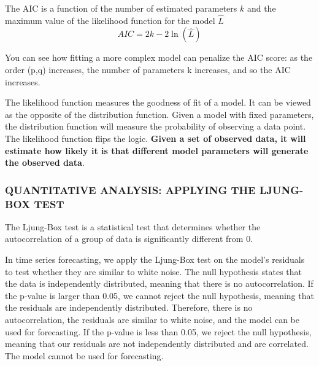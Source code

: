 The AIC is a function of the number of estimated parameters $k$ and the maximum value of the likelihood function for the model $\hat{L}$
\begin{equation}
    AIC = 2k-2\ln(\hat{L})
\end{equation}

You can see how fitting a more complex model can penalize the AIC score: as the order (p,q) increases, the number of parameters k increases, and so the AIC increases.

The likelihood function measures the goodness of fit of a model. It can be viewed as the opposite of the distribution function. Given a model with fixed parameters, the distribution function will measure the probability of observing a data point. The likelihood function flips the logic. \textbf{Given a set of observed data, it will estimate how likely it is that different model parameters will generate the observed data}.

\subsubsection*{QUANTITATIVE ANALYSIS: APPLYING THE LJUNG-BOX TEST}
The Ljung-Box test is a statistical test that determines whether the autocorrelation of a group of data is significantly different from 0.

In time series forecasting, we apply the Ljung-Box test on the model's residuals to test whether they are similar to white noise. The null hypothesis states that the data is independently distributed, meaning that there is no autocorrelation. If the p-value is larger than 0.05, we cannot reject the null hypothesis, meaning that the residuals are independently distributed. Therefore, there is no autocorrelation, the residuals are similar to white noise, and the model can be used for forecasting. If the p-value is less than 0.05, we reject the null hypothesis, meaning that our residuals are not independently distributed and are correlated. The model cannot be used for forecasting.


